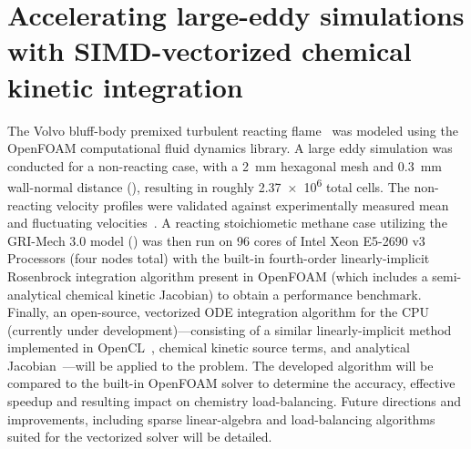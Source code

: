 \documentclass[a4paper,10pt]{article}
\begin{document}
\section{Accelerating large-eddy simulations with SIMD-vectorized chemical kinetic integration}
The Volvo bluff-body premixed turbulent reacting flame~\cite{sjunnesson1991validation,sjunnesson1991lda} was modeled using the OpenFOAM computational fluid dynamics library.
A large eddy simulation was conducted for a non-reacting case, with a \SI{2}{\milli\meter} hexagonal mesh and \SI{0.3}{\milli\meter} wall-normal distance (), resulting in roughly \num{2.37e6} total cells.
The non-reacting velocity profiles were validated against experimentally measured mean and fluctuating velocities~\cite{sjunnesson1991validation,sjunnesson1991lda}.
A reacting stoichiometic methane case utilizing the GRI-Mech 3.0 model () was then run on \num{96} cores of Intel\raisebox{1ex}{\scriptsize{\textregistered}} Xeon\raisebox{1ex}{\scriptsize{\textregistered}} E5-2690 v3 Processors (four nodes total) with the built-in fourth-order linearly-implicit Rosenbrock integration algorithm present in OpenFOAM (which includes a semi-analytical chemical kinetic Jacobian) to obtain a performance benchmark.
Finally, an open-source, vectorized ODE integration algorithm for the CPU (currently under development)---consisting of a similar linearly-implicit method implemented in OpenCL~\cite{STONE201818}, chemical kinetic source terms, and analytical Jacobian~---will be applied to the problem.
The developed algorithm will be compared to the built-in OpenFOAM solver to determine the accuracy, effective speedup and resulting impact on chemistry load-balancing.
Future directions and improvements, including sparse linear-algebra and load-balancing algorithms suited for the vectorized solver will be detailed.
\end{document}
